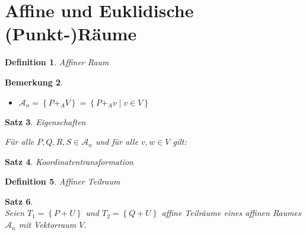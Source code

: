 \documentclass[%
a4paper,
10pt,           %
]
{scrartcl}
\theoremstyle{plain}
\newtheorem{mydef}{Definition}[section]
\theoremstyle{plain}
\newtheorem{mysatz}[mydef]{Satz}
\theoremstyle{plain}
\theoremstyle{plain}
\newtheorem{mybem}[mydef]{Bemerkung}
\theoremstyle{plain}
\begin{document}



\section{Affine und Euklidische (Punkt-)Räume} %
\label{sec:Affine und Euklidische (Punkt-)Räume}

\begin{mydef}
    Affiner Raum
\end{mydef}

\begin{mybem}
    \begin{itemize}
        \item $\mathcal{A}_n = \left\{ P +_A V \right\} = \left\{ P +_A v \mid v \in V \right\}$
    \end{itemize}
\end{mybem}

\begin{mysatz}
    Eigenschaften

    Für alle $P,Q,R,S \in \mathcal{A}_n$ und  für alle $v,w \in V$ gilt:
\end{mysatz}

\begin{mysatz}
    Koordinatentransformation
\end{mysatz}

\begin{mydef}
    Affiner Teilraum
\end{mydef}

\begin{mysatz}
    \ \\
    Seien $T_1 = \left\{ P+U \right\}$ und $T_2 = \left\{ Q+U \right\}$ affine Teilräume eines affinen Raumes $\mathcal{A}_n$ mit Vektorraum $V$.
\end{mysatz}
\end{document}
